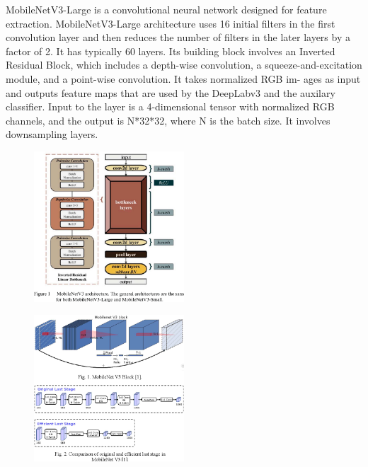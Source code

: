 MobileNetV3-Large is a convolutional neural network designed for feature extraction. MobileNetV3-Large architecture uses 16 initial filters in the first convolution layer and then reduces the number of filters in the later layers by a factor of 2. It has typically 60 layers. Its building block involves an Inverted Residual Block, which includes a depth-wise convolution, a squeeze-and-excitation module, and a point-wise convolution. It takes normalized RGB im-
ages as input and outputs feature maps that are used by the
DeepLabv3 and the auxilary classifier. Input to the layer is
a 4-dimensional tensor with normalized RGB channels, and
the output is N*32*32, where N is the batch size. It involves downsampling layers.

\begin{figure}[ht]
    \centering
    \includegraphics[width=0.5\textwidth]{Images/mobilenet-1.png}
    \caption{\cite{mobilenet-1}}
    \label{fig:mobilenet-1}
\end{figure}

\begin{figure}[ht]
    \centering
    \includegraphics[width=0.5\textwidth]{Images/mobilenet-2.png}
    \caption{\cite{mobilenet-2}}
    \label{fig:mobilenet-2}
\end{figure}

